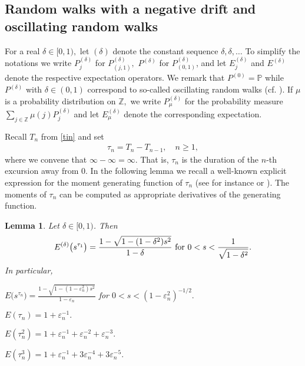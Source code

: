 \documentclass[12pt]{amsart}
\newtheorem{lemma}[theorem]{Lemma}
\begin{document}
\subsection{Random walks with a negative drift and oscillating random walks}
\label{fixed}
For a real $\delta \in [0,1),$ let $(\delta)$ denote the constant sequence
$\delta,\delta,\ldots$ To simplify the notations we write
$P^{(\delta)}_j$ for $P_{(j,1)}^{(\delta)},$ $P^{(\delta)}$ for
$P_{(0,1)}^{(\delta)}$, and let $E^{(\delta)}_j$ and $E^{(\delta)}$
denote the respective expectation operators. We remark that
$P^{(0)}={{\mathbb P}}$ while $P^{(\delta)}$ with $\delta\in(0,1)$ correspond
to so-called oscillating random walks (cf. \cite{kemperman,
borovkov}). If $\mu$ is a probability distribution on ${{\mathbb Z}},$ we
write $P^{(\delta)}_{\mu}$ for the probability measure $\sum_{j\in
{{\mathbb Z}}}\mu(j) P^{(\delta)}_j$ and let $E^{(\delta)}_{\mu}$ denote the
corresponding expectation.
\par
Recall $T_n$ from \eqref{tin} and set \begin{eqnarray} \label{tau} \tau_n =
T_{n}-T_{n-1},\quad n\geq 1,\end{eqnarray} where we convene that
$\infty-\infty=\infty.$ That is, $\tau_n$ is the duration of the
$n$-th excursion away from $0$. In the following lemma we recall a
well-known explicit expression for the moment generating function of
$\tau_n$ (see for instance\cite[p.~273]{feller1} or
\cite[p.~276]{durrett}). The moments of $\tau_n$ can be computed
as appropriate derivatives of the generating function.
\begin{lemma}
\label{lem:timoments} Let $\delta \in [0,1)$. Then \begin{eqnarray*}
E^{(\delta)}\bigl( s^{\tau_1}\bigr)=
{\frac {\displaystyle {1-\sqrt{1-(1-\delta^2)s^2}}}{\displaystyle {1-\delta} }}\mbox{ \rm  for }0< s <
{\frac {\displaystyle {1}}{\displaystyle {\sqrt{1-\delta^2}} }}. \end{eqnarray*} In particular,
\item $E  \bigl(s^{\tau_n}\bigr)=
{\frac {\displaystyle {1-\sqrt{1-(1-{\varepsilon}_n^2)s^2}}}{\displaystyle {1-{\varepsilon}_n} }}$ for $0< s <
(1-{\varepsilon}_n^2)^{-1/2}.$
\item  $E(\tau_n)=1+{\varepsilon}_n^{-1}.$
\item  $E(\tau_n^2)=1+{\varepsilon}_n^{-1}+{\varepsilon}_n^{-2}+{\varepsilon}_n^{-3}.$
\item  $E(\tau_n^3)=1+{\varepsilon}_n^{-1}+3{\varepsilon}_n^{-4}+3{\varepsilon}_n^{-5}.$
\end{lemma}
\end{document}
